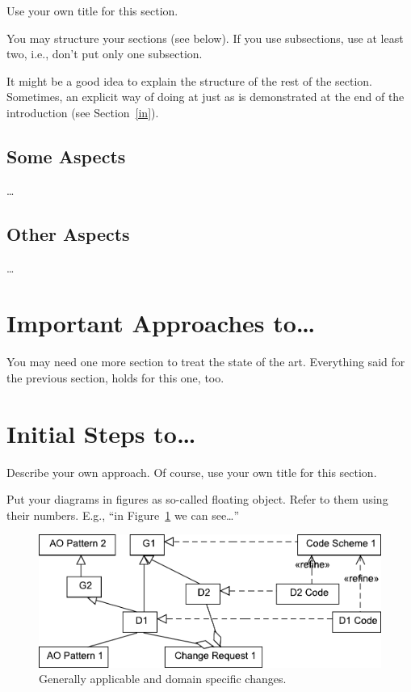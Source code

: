 \documentclass[11pt,english,a4paper,twoside]{article}
\newcommand{\magnf}{.65}
\begin{document}
Use your own title for this section.

You may structure your sections (see below).
If you use subsections, use at least two, i.e., don't put only one subsection.

It might be a good idea to explain the structure of the rest of the section. Sometimes, an explicit way of doing at just as is demonstrated at the end of the introduction (see Section~\ref{in}).


\subsection{Some Aspects} \label{insight-some}

\ldots

\subsection{Other Aspects} \label{insight-other}

\ldots



\section{Important Approaches to\ldots} \label{approaches}

You may need one more section to treat the state of the art.
Everything said for the previous section, holds for this one, too.




\section{Initial Steps to\ldots} \label{initial}

Describe your own approach.
Of course, use your own title for this section.

Put your diagrams in figures as so-called floating object.
Refer to them using their numbers.
E.g., ``in Figure~\ref{f:gen-spec} we can see\ldots''

\begin{figure}[tbh] \centering
\includegraphics[scale=\magnf]{fig/gen-spec}
\caption{Generally applicable and domain specific changes.}
\label{f:gen-spec}
\end{figure}
\end{document}
